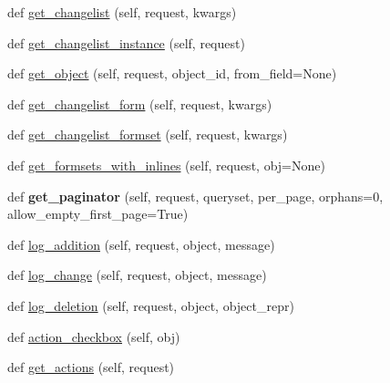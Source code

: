 \begin{DoxyCompactItemize}
def \mbox{\hyperlink{classdjango_1_1contrib_1_1admin_1_1options_1_1_model_admin_a9b45199e2c68a66394421fca15073295}{get\+\_\+changelist}} (self, request, kwargs)
\item 
def \mbox{\hyperlink{classdjango_1_1contrib_1_1admin_1_1options_1_1_model_admin_a77627001bb3f46295f78a2dd5f892254}{get\+\_\+changelist\+\_\+instance}} (self, request)
\item 
def \mbox{\hyperlink{classdjango_1_1contrib_1_1admin_1_1options_1_1_model_admin_a9d8fe5dc46588f2e6a68135c73c1487f}{get\+\_\+object}} (self, request, object\+\_\+id, from\+\_\+field=None)
\item 
def \mbox{\hyperlink{classdjango_1_1contrib_1_1admin_1_1options_1_1_model_admin_a0f2d13fdd81b2a04f637fc629e984c5e}{get\+\_\+changelist\+\_\+form}} (self, request, kwargs)
\item 
def \mbox{\hyperlink{classdjango_1_1contrib_1_1admin_1_1options_1_1_model_admin_a2ad00fc8e34d18a0bdbc1314796e6e47}{get\+\_\+changelist\+\_\+formset}} (self, request, kwargs)
\item 
def \mbox{\hyperlink{classdjango_1_1contrib_1_1admin_1_1options_1_1_model_admin_ad0f67e48cb1dc23f9349fd1b527a78fd}{get\+\_\+formsets\+\_\+with\+\_\+inlines}} (self, request, obj=None)
\item 
\mbox{\label{classdjango_1_1contrib_1_1admin_1_1options_1_1_model_admin_a9aa2649700681c1fa726deae1d0e5352}} 
def {\bfseries get\+\_\+paginator} (self, request, queryset, per\+\_\+page, orphans=0, allow\+\_\+empty\+\_\+first\+\_\+page=True)
\item 
def \mbox{\hyperlink{classdjango_1_1contrib_1_1admin_1_1options_1_1_model_admin_abad1d1520beec051e1ac0763112d55d8}{log\+\_\+addition}} (self, request, object, message)
\item 
def \mbox{\hyperlink{classdjango_1_1contrib_1_1admin_1_1options_1_1_model_admin_ae75e8f5048939e928e649d9d1f35c9c0}{log\+\_\+change}} (self, request, object, message)
\item 
def \mbox{\hyperlink{classdjango_1_1contrib_1_1admin_1_1options_1_1_model_admin_a26c8bf3c50ec451ffc671755c4626968}{log\+\_\+deletion}} (self, request, object, object\+\_\+repr)
\item 
def \mbox{\hyperlink{classdjango_1_1contrib_1_1admin_1_1options_1_1_model_admin_ab0751cb5959093c89944108d5ff89766}{action\+\_\+checkbox}} (self, obj)
\item 
def \mbox{\hyperlink{classdjango_1_1contrib_1_1admin_1_1options_1_1_model_admin_a18360f20a3d210ded48ea4643a05093f}{get\+\_\+actions}} (self, request)

\end{DoxyCompactItemize}
